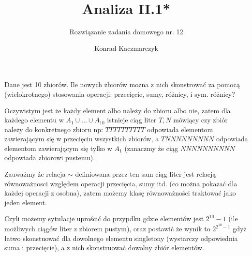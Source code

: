 \documentclass[11pt]{scrartcl}
\author{Konrad Kaczmarczyk}
\begin{document}
  \title{Analiza II.1*}
  \subtitle{Rozwiązanie zadania domowego nr. 12}
  \maketitle
    \begin{zadanie*}
        Dane jest 10 zbiorów. Ile nowych zbiorów można z nich skonstrować za pomocą (wielokrotnego) stosowania operacji: przecięcie, sumy, różnicy, i sym. różnicy?
    \end{zadanie*}
    
    Oczywistym jest że każdy element albo należy do zbioru albo nie, zatem dla każdego elementu w $A_1 \cup \dots  \cup A_{10}$ istnieje ciąg liter $T, N$ mówiący czy zbiór należy do konkretnego zbioru np: $TTTTTTTTTT$ odpowiada elementom zawierającym się w przecięciu wszystkich zbiorów, a $TNNNNNNNNN$ odpowiada elementom zawierającym się tylko w $A_1$ (zanaczmy że ciąg $NNNNNNNNNN$ odpowiada zbiorowi pustemu). 


    Zauważmy że relacja $\sim$ definiowana przez ten sam ciąg liter jest relacją równoważnosci względem operacji przecięcia, sumy itd. (co można pokazać dla każdej operacji z osobna), zatem możemy klasę równoważności traktować jako jeden element. 
    
    Czyli możemy sytułacje uprościć do przypdku gdzie elementów jest $2^{10} - 1$ (ile możliwych ciągów liter z zbiorem pustym), oraz postawić że wynik to $2^{2^{10}-1}$ gdyż łatwo skonstuować dla dowolnego elementu singletony (wystarczy odpowiednia suma i przecięcie), a z nich skonstruować dowolny zbiór elementów.
\end{document}
